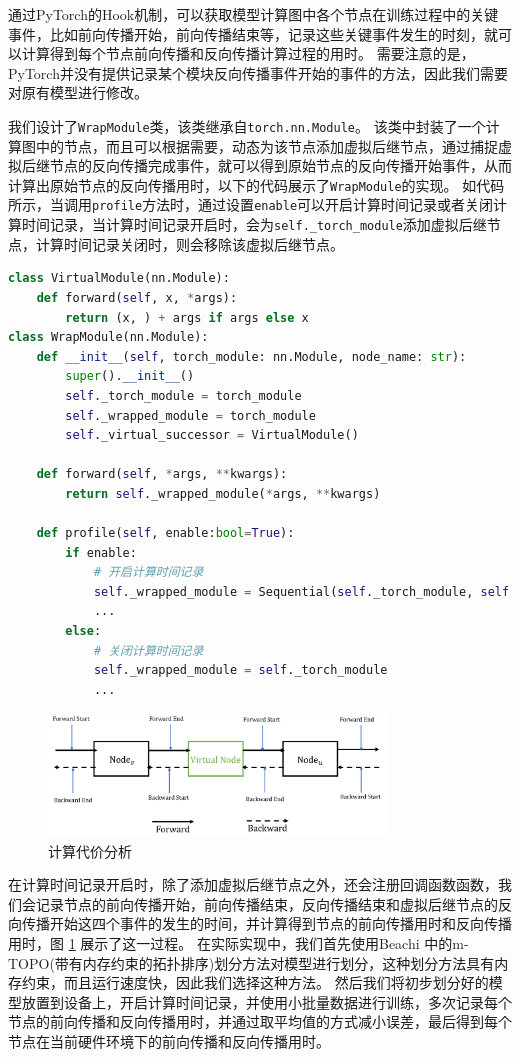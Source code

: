 通过PyTorch的Hook机制，可以获取模型计算图中各个节点在训练过程中的关键事件，比如前向传播开始，前向传播结束等，记录这些关键事件发生的时刻，就可以计算得到每个节点前向传播和反向传播计算过程的用时。
需要注意的是，PyTorch并没有提供记录某个模块反向传播事件开始的事件的方法，因此我们需要对原有模型进行修改。

我们设计了\texttt{WrapModule}类，该类继承自\texttt{torch.nn.Module}。
该类中封装了一个计算图中的节点，而且可以根据需要，动态为该节点添加虚拟后继节点，通过捕捉虚拟后继节点的反向传播完成事件，就可以得到原始节点的反向传播开始事件，从而计算出原始节点的反向传播用时，以下的代码展示了\texttt{WrapModule}的实现。
如代码所示，当调用\texttt{profile}方法时，通过设置\texttt{enable}可以开启计算时间记录或者关闭计算时间记录，当计算时间记录开启时，会为\texttt{self.\_torch\_module}添加虚拟后继节点，计算时间记录关闭时，则会移除该虚拟后继节点。

\begin{lstlisting}[language=Python, caption={WrapModule实现}]	
class VirtualModule(nn.Module):
	def forward(self, x, *args):
		return (x, ) + args if args else x
class WrapModule(nn.Module):
	def __init__(self, torch_module: nn.Module, node_name: str):
		super().__init__()
		self._torch_module = torch_module
		self._wrapped_module = torch_module
		self._virtual_successor = VirtualModule()

	def forward(self, *args, **kwargs):
		return self._wrapped_module(*args, **kwargs)
	
	def profile(self, enable:bool=True):
		if enable:
			# 开启计算时间记录
			self._wrapped_module = Sequential(self._torch_module, self.virtual_sucessir)
			...
		else:
			# 关闭计算时间记录
			self._wrapped_module = self._torch_module
			...
\end{lstlisting}

\begin{figure}[h]
	\centering
	\includegraphics[width=0.8\textwidth]{figure/3-system/profile.pdf}
	\caption{计算代价分析}
	\label{fig:profile}
\end{figure}

在计算时间记录开启时，除了添加虚拟后继节点之外，还会注册回调函数函数，我们会记录节点的前向传播开始，前向传播结束，反向传播结束和虚拟后继节点的反向传播开始这四个事件的发生的时间，并计算得到节点的前向传播用时和反向传播用时，图 \ref{fig:profile} 展示了这一过程。
在实际实现中，我们首先使用Beachi 中的m-TOPO(带有内存约束的拓扑排序)划分方法对模型进行划分，这种划分方法具有内存约束，而且运行速度快，因此我们选择这种方法。
然后我们将初步划分好的模型放置到设备上，开启计算时间记录，并使用小批量数据进行训练，多次记录每个节点的前向传播和反向传播用时，并通过取平均值的方式减小误差，最后得到每个节点在当前硬件环境下的前向传播和反向传播用时。

